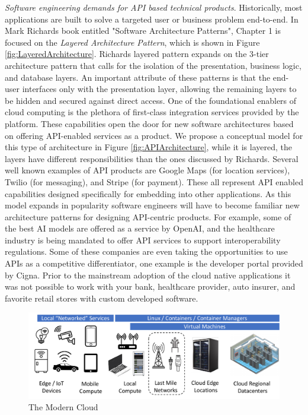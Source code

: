 \documentclass[conference]{IEEEtran}
\begin{document}
\textit{Software engineering demands for API based technical products}.  Historically, most applications are built to solve a targeted user or business problem end-to-end.  In Mark Richards book entitled "Software Architecture Patterns"\cite{richards2015software}, Chapter 1 is focused on the \textit{Layered Architecture Pattern}, which is shown in Figure \ref{fig:LayeredArchitecture}. Richards layered pattern expands on the 3-tier architecture pattern\cite{aarsten1996patterns} that calls for the isolation of the presentation, business logic, and database layers. An important attribute of these patterns is that the end-user interfaces only with the presentation layer, allowing the remaining layers to be hidden and secured against direct access. One of the foundational enablers of cloud computing is the plethora of first-class integration services provided by the platform. These capabilities open the door for new software architectures based on offering API-enabled services as a product. We propose a conceptual model for this type of architecture in Figure \ref{fig:APIArchitecture}, while it is layered, the layers have different responsibilities than the ones discussed by Richards. Several well known examples of API products are Google Maps (for location services), Twilio (for messaging), and Stripe (for payment). These all represent API enabled capabilities designed specifically for embedding into other applications. As this model expands in popularity software engineers will have to become familiar new architecture patterns for designing API-centric products.  For example, some of the best AI models are offered as a service by OpenAI\cite{OpenAI}, and the healthcare industry is being mandated to offer API services to support interoperability\cite{FHIRAPI} regulations.  Some of these companies are even taking the opportunities to use APIs as a competitive differentiator, one example is the developer portal provided by Cigna\cite{CignaDeveloper}. Prior to the mainstream adoption of the cloud native applications it was not possible to work with your bank, healthcare provider, auto insurer, and favorite retail stores with custom developed software. 


\begin{figure}[t!]
	\includegraphics[width=\textwidth]{images/CloudTopo2.pdf}	
	\caption{The Modern Cloud}
	\label{fig:CloudTopo}
\end{figure}
\end{document}
